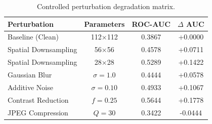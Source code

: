 \begin{table}[ht]
\centering\small
\begin{tabular}{lccc}
\toprule
Perturbation & Parameters & ROC-AUC & $\Delta$ AUC \\
\midrule
Baseline (Clean) & 112$\times$112 & 0.3867 & +0.0000 \\
Spatial Downsampling & 56$\times$56 & 0.4578 & +0.0711 \\
Spatial Downsampling & 28$\times$28 & 0.5289 & +0.1422 \\
Gaussian Blur & $\sigma=1.0$ & 0.4444 & +0.0578 \\
Additive Noise & $\sigma=0.10$ & 0.4933 & +0.1067 \\
Contrast Reduction & $f=0.25$ & 0.5644 & +0.1778 \\
JPEG Compression & $Q=30$ & 0.3422 & -0.0444 \\
\bottomrule
\end{tabular}
\caption{Controlled perturbation degradation matrix.}
\label{tab:robustness_results}
\end{table}
